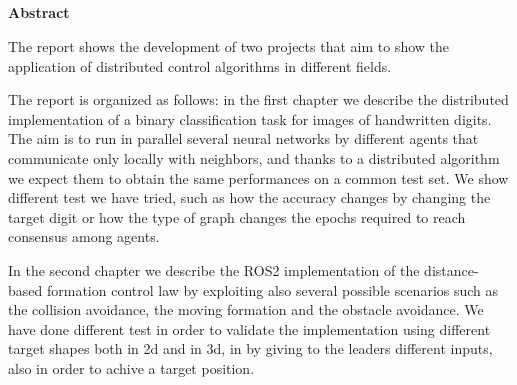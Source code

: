 \documentclass[a4paper,11pt,oneside]{book}
\begin{document}
\newpage
\thispagestyle{empty}

\begin{center}
\chapter*{}
\thispagestyle{empty}
{\Huge \textbf{Abstract}}\\
\vspace{15mm}
\end{center}

The report shows the development of two projects that aim to show the application of distributed control algorithms in different fields.

\bigskip
The report is organized as follows: in the first chapter we describe the distributed implementation of a binary classification task for images of handwritten digits. The aim is to run in parallel several neural networks by different agents that communicate only locally with neighbors, and thanks to a distributed algorithm we expect them to obtain the same performances on a common test set. We show different test we have tried, such as how the accuracy changes by changing the target digit or how the type of graph changes the epochs required to reach consensus among agents.

\bigskip
In the second chapter we describe the ROS2 implementation of the distance-based formation control law by exploiting also several possible scenarios such as the collision avoidance, the moving formation and the obstacle avoidance. 
We have done different test in order to validate the implementation using different target shapes both in 2d and in 3d, in by giving to the leaders different inputs, also in order to achive a target position.

\tableofcontents \thispagestyle{empty}

%
\end{document}
